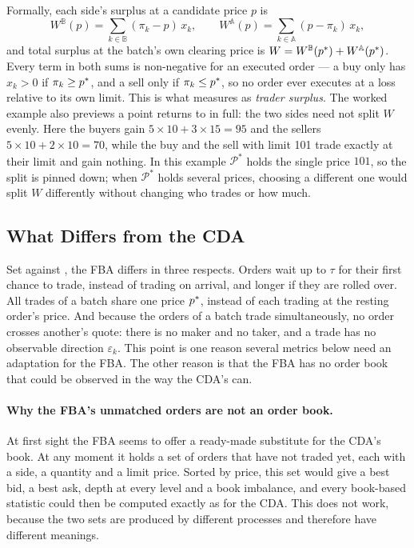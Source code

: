 Formally, each side's surplus at a candidate price $p$ is
\begin{equation}
  \label{eq:surplus}
  W^{\mathbb{B}}(p) = \sum_{k \in \mathbb{B}} (\pi_k - p)\, x_k,
  \qquad
  W^{\mathbb{A}}(p) = \sum_{k \in \mathbb{A}} (p - \pi_k)\, x_k,
\end{equation}
and total surplus at the batch's own clearing price is $W =
W^{\mathbb{B}}(p^{\ast}) + W^{\mathbb{A}}(p^{\ast})$. Every
term in both sums is non-negative for an executed order --- a buy only
has $x_k>0$ if $\pi_k \ge p^{\ast}$, and a sell only if $\pi_k \le p^{\ast}$, so
no order ever executes at a loss relative to its own limit. This is what
 measures as \emph{trader surplus}. The worked example
also previews a point  returns to in full: the
two sides need not split $W$ evenly. Here the buyers gain
$5 \times 10 + 3 \times 15 = 95$ and the sellers
$5 \times 10 + 2 \times 10 = 70$, while the buy and the sell with limit
101 trade exactly at their limit and gain nothing. In this example
$\mathcal{P}^{*}$ holds the single price $101$, so the split is pinned
down; when $\mathcal{P}^{*}$ holds
several prices, choosing a different one would split $W$ differently
without changing who trades or how much.

\subsection{What Differs from the CDA}
\label{sec:fbavscda}

Set against , the FBA differs in three respects. Orders
wait up to $\tau$ for their first chance to trade, instead of trading on
arrival, and longer if they are rolled over.
All trades of a batch share one price $p^{\ast}$, instead of each trading at
the resting order's price. And because the orders of a batch trade
simultaneously, no order crosses another's quote: there is no maker and
no taker, and a trade has no observable direction $\varepsilon_k$. This
point is one reason several metrics below need an adaptation for the
FBA. The other reason is that the FBA has no order book that could be
observed in the way the CDA's can.

\paragraph{Why the FBA's unmatched orders are not an order book.} At
first sight the FBA seems to offer a ready-made substitute for the CDA's
book. At any moment it holds a set of orders that have not traded yet,
each with a side, a quantity and a limit price. Sorted by price, this set
would give a best bid, a best ask, depth at every level and a book
imbalance, and every book-based statistic could then be computed exactly
as for the CDA. This does not work, because the two sets are produced by
different processes and therefore have different meanings.

